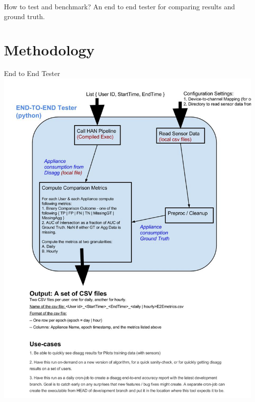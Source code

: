 \documentclass[xcolor=svgnames,handout]{beamer}
\begin{document}
\begin{frame}{How to test and benchmark?}
  An end to end tester for comparing results and ground truth.
\end{frame}


\section
    {Methodology}

    \begin{frame}
      {End to End Tester}
      \includegraphics[height=\textheight]{Design_of_End2End_tester}
    \end{frame}
\end{document}
